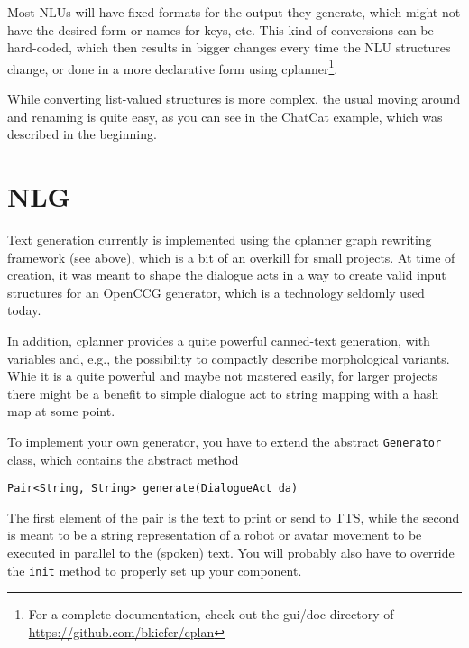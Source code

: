 Most NLUs will have fixed formats for the output they generate, which
might not have the desired form or names for keys, etc. This kind of
conversions can be hard-coded, which then results in bigger changes
every time the NLU structures change, or done in a more declarative
form using cplanner\footnote{For a complete documentation, check out
  the gui/doc directory of \url{https://github.com/bkiefer/cplan}}.

While converting list-valued structures is more complex, the usual
moving around and renaming is quite easy, as you can see in the
ChatCat example, which was described in the beginning.


\section{NLG}

Text generation currently is implemented using the cplanner graph
rewriting framework (see above), which is a bit of an overkill for
small projects. At time of creation, it was meant to shape the
dialogue acts in a way to create valid input structures for an OpenCCG
generator, which is a technology seldomly used today.

In addition, cplanner provides a quite powerful canned-text
generation, with variables and, e.g., the possibility to compactly
describe morphological variants. Whie it is a quite powerful and maybe
not mastered easily, for larger projects there might be a benefit to
simple dialogue act to string mapping with a hash map at some point.

To implement your own generator, you have to extend the abstract
\texttt{Generator} class, which contains the abstract method

\verb|Pair<String, String> generate(DialogueAct da)|

The first element of the pair is the text to print or send to TTS,
while the second is meant to be a string representation of a robot or
avatar movement to be executed in parallel to the (spoken) text. You
will probably also have to override the \texttt{init} method to
properly set up your component.


